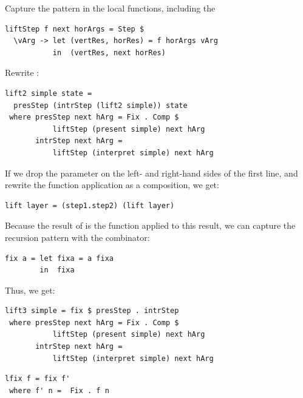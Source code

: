 \documentclass[preprint,natbib]{sigplanconf}
\begin{document}
Capture the pattern in the local functions, including the 

\begin{small} %
\begin{verbatim}
liftStep f next horArgs = Step $ 
  \vArg -> let (vertRes, horRes) = f horArgs vArg
           in  (vertRes, next horRes)
\end{verbatim}%
\end{small}

Rewrite :

\begin{small} %
\begin{verbatim}
lift2 simple state =
  presStep (intrStep (lift2 simple)) state
 where presStep next hArg = Fix . Comp $
           liftStep (present simple) next hArg
       intrStep next hArg =
           liftStep (interpret simple) next hArg
\end{verbatim}%
\end{small}



If we drop the  parameter on the left- and right-hand sides of the first line, and rewrite the function application as a composition, we get:
\
\begin{small}
\begin{verbatim}
lift layer = (step1.step2) (lift layer)
\end{verbatim}
\end{small}

Because the result of  is the function  applied to this result, we can capture the recursion pattern with  the  combinator:

\begin{small}
\begin{verbatim}
fix a = let fixa = a fixa
        in  fixa
\end{verbatim}
\end{small}

Thus, we get:

\begin{small} %
\begin{verbatim}
lift3 simple = fix $ presStep . intrStep
 where presStep next hArg = Fix . Comp $
           liftStep (present simple) next hArg
       intrStep next hArg = 
           liftStep (interpret simple) next hArg
\end{verbatim}
\end{small}


\begin{small}
\begin{verbatim}
lfix f = fix f' 
 where f' n =  Fix . f n
\end{verbatim}
\end{small}
\end{document}
